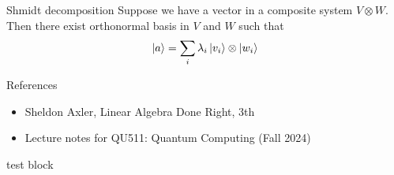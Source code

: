 \documentclass[9pt]{beamer}
\begin{document}
    \begin{frame}{Shmidt decomposition}
        Suppose we have a vector in a composite system $V \otimes W$. Then there exist orthonormal basis in $V$ and $W$ such that
        $$ \ket a = \sum_i \lambda_i \ket{v_i} \otimes \ket{w_i}$$
    \end{frame}
    
    \begin{frame}{References}
        
        \begin{itemize}
            \item Sheldon Axler, Linear Algebra Done Right, 3th
            \item Lecture notes for QU511: Quantum Computing (Fall 2024)
        \end{itemize}

        \begin{alertblock}{test block}
        \end{alertblock}
    \end{frame}
    
\end{document}
